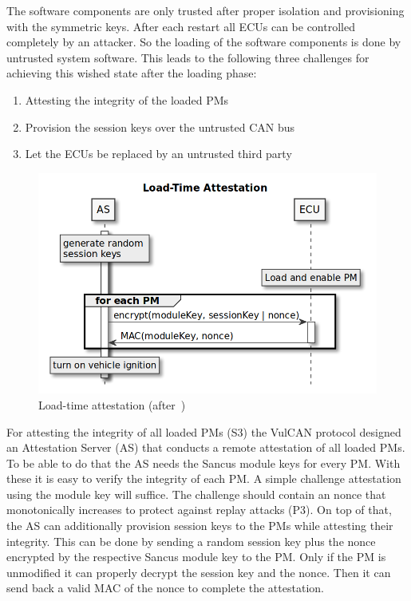 The software components are only trusted after proper isolation and provisioning with the symmetric keys. After each restart all ECUs can be controlled completely by an attacker. So the loading of the software components is done by untrusted system software. This leads to the following three challenges for achieving this wished state after the loading phase:

\begin{enumerate}
    \item Attesting the integrity of the loaded PMs
    \item Provision the session keys over the untrusted CAN bus
    \item Let the ECUs be replaced by an untrusted third party
\end{enumerate}

\begin{figure}[h]
    \centering
    \captionsetup{justification=centering}
	\includegraphics[width=1\linewidth]{Figures/VulCAN_attestation.png}
	\caption[]{Load-time attestation (after~\cite{VanBulck2017})}
	\label{fig:vulcan_load_attestation}
\end{figure}

For attesting the integrity of all loaded PMs (S3) the VulCAN protocol designed
an Attestation Server (AS) that conducts a remote attestation of all loaded PMs.
To be able to do that the AS needs the Sancus module keys for every PM\@. With
these it is easy to verify the integrity of each PM\@. A simple challenge
attestation using the module key will suffice. The challenge should contain an
nonce that monotonically increases to protect against replay attacks (P3). On
top of that, the AS can additionally provision session keys to the PMs while
attesting their integrity. This can be done by sending a random session key plus
the nonce encrypted by the respective Sancus module key to the PM\@. Only if the
PM is unmodified it can properly decrypt the session key and the nonce. Then it
can send back a valid MAC of the nonce to complete the attestation.

